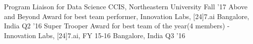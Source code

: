 \begin{cvhonors}
    \cvhonor
    {Program Liaison for Data Science}
    {CCIS, Northeastern University}
    {}
    {Fall '17}
  \cvhonor
    {Above and Beyond}
    {Award for best team performer, Innovation Labs, [24]7.ai}
    {Bangalore, India}
    {Q2 '16}
  \cvhonor
    {Super Trooper}
    {Award for best team of the year(4 members) - Innovation Labs, [24]7.ai, FY 15-16}
    {Bangalore, India}
    {Q3 '16}
\end{cvhonors}
